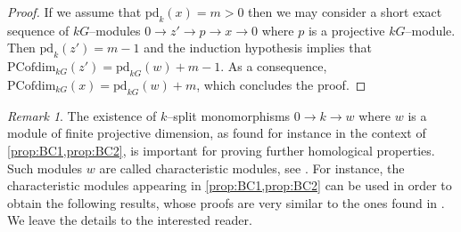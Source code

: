 \documentclass{amsart}
\newcommand{\OG}[1]{{\color{brown} O: [#1]}}
\newcommand{\res}{\operatorname{res}\nolimits}
\newcommand{\Ext}{\operatorname{Ext}\nolimits}
\def \W{{\mathcal W}}
\numberwithin{equation}{section}%
\theoremstyle{remark}
\newtheorem{remark}[equation]{Remark}
\begin{document}
{\begin{proof}
If we assume that $\mathrm{pd}_k(x)=m>0$ then we may consider a short exact sequence of $kG$--modules $0\rightarrow z'\rightarrow p \rightarrow x\rightarrow 0$ where $p$ is a projective $kG$--module. Then $\mathrm{pd}_k(z')=m-1$ and the induction hypothesis implies that $\mathrm{PCofdim}_{kG}(z')=\mathrm{pd}_{kG}(w)+m-1$. As a consequence, $\mathrm{PCofdim}_{kG}(x)=\mathrm{pd}_{kG}(w)+m$, which concludes the proof.
\end{proof}





\begin{remark}
The existence of $k$--split monomorphisms $0\rightarrow k\rightarrow w$ where $w$ is a module of finite projective dimension, as found for instance in the context of  \cref{prop:BC1,prop:BC2}, is important for proving further homological properties. Such modules $w$ are called characteristic modules, see \cite{tal-char,em-tal-char}. For instance, the characteristic modules appearing in  \cref{prop:BC1,prop:BC2} can be used in order to obtain the following results, whose proofs are very similar to the ones found in \cite[Propositions~2.1 and 2.4]{em-t}. We leave the details to the interested reader.
\end{remark}

}
\end{document}
